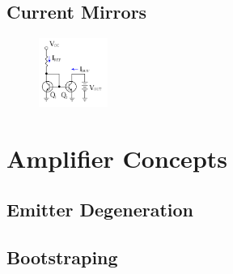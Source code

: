 \documentclass{report}
\newcommand{\imwidth}{0.2\textwidth}
\begin{document}
\section{Current Mirrors}
\begin{figure}
\centering
\includegraphics[width = \imwidth]{Simple_bipolar_mirror}
\caption{}
\end{figure}


\chapter{Amplifier Concepts}
\section{Emitter Degeneration}
\section{Bootstraping}

\nocite{*}
\printbibliography
\end{document}
